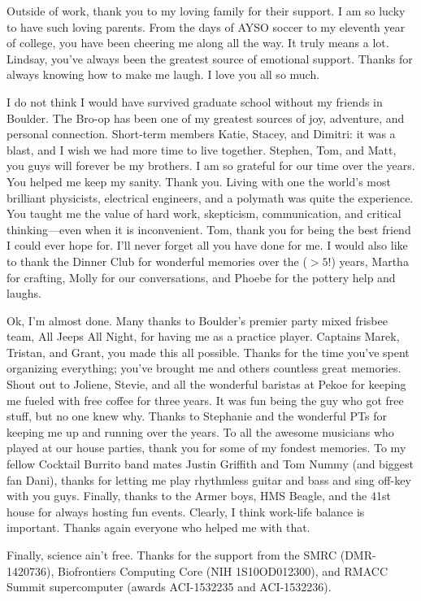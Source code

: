 {  Outside of work, thank you to my loving family for their support.  I am so
  lucky to have such loving parents. From the days of AYSO soccer to my eleventh
  year of college, you have been cheering me along all the way.  It truly means
  a lot.  Lindsay, you've always been the greatest source of emotional support.
  Thanks for always knowing how to make me laugh. I love you all so much.

  I do not think I would have survived graduate school without my friends in
  Boulder. The Bro-op has been one of my greatest sources of joy, adventure, and
  personal connection.  Short-term members Katie, Stacey, and Dimitri: it was a
  blast, and I wish we had more time to live together.  Stephen, Tom, and Matt,
  you guys will forever be my brothers. I am so grateful for our time over the
  years. You helped me keep my sanity. Thank you. Living with one the world's
  most brilliant physicists, electrical engineers, and a polymath was quite the
  experience. You taught me the value of hard work, skepticism, communication,
  and critical thinking---even when it is inconvenient. Tom, thank you for being
  the best friend I could ever hope for.  I'll never forget all you have done
  for me.  I would also like to thank the Dinner Club for wonderful memories
  over the ($>5$!) years, Martha for crafting, Molly for our conversations, and
  Phoebe for the pottery help and laughs.

  Ok, I'm almost done. Many thanks to Boulder's premier party mixed frisbee
  team, All Jeeps All Night, for having me as a practice player. Captains Marek,
  Tristan, and Grant, you made this all possible. Thanks for the time you've
  spent organizing everything; you've brought me and others countless great
  memories. Shout out to Joliene, Stevie, and all the wonderful baristas at
  Pekoe for keeping me fueled with free coffee for three years. It was fun being
  the guy who got free stuff, but no one knew why. Thanks to Stephanie and the
  wonderful PTs for keeping me up and running over the years. To all the awesome
  musicians who played at our house parties, thank you for some of my fondest
  memories.  To my fellow Cocktail Burrito band mates Justin Griffith and Tom
  Nummy (and biggest fan Dani), thanks for letting me play rhythmless guitar and
  bass and sing off-key with you guys.  Finally, thanks to the Armer boys, HMS
  Beagle, and the 41st house for always hosting fun events.  Clearly, I think
  work-life balance is important.  Thanks again everyone who helped me with
  that.

  Finally, science ain't free. Thanks for the support from the SMRC
  (DMR-1420736), Biofrontiers Computing Core (NIH 1S10OD012300), and RMACC
  Summit supercomputer (awards ACI-1532235 and ACI-1532236).
}


